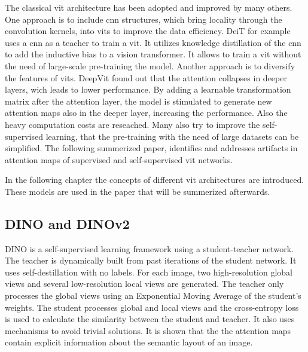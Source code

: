 \documentclass[conference]{IEEEtran}
\begin{document}
  The classical \ac{vit} architecture has been adopted and improved by many others. One approach is to include \ac{cnn} structures, which bring locality through the convolution kernels, into \acp{vit} to improve the data efficiency. DeiT \cite{deit} for example uses a \ac{cnn} as a teacher to train a \ac{vit}. It utilizes knowledge distillation of the \ac{cnn} to add the inductive bias to a vision transformer. It allows to train a \ac{vit} without the need of large-scale pre-training the model. \cite{vit-state-challenges} Another approach is to diversify the features of \acp{vit}. DeepVit \cite{deepvit} found out that the attention collapses in deeper layers, wich leads to lower performance. By adding a learnable transformation matrix after the attention layer, the model is stimulated to generate new attention maps also in the deeper layer, increasing the performance. \cite{vit-state-challenges} Also the heavy computation costs are reseached. Many also try to improve the self-supervised learning, that the pre-training with the need of large datasets can be simplified. \cite{vit-state-challenges} The following summerized paper, identifies and addresses artifacts in attention maps of supervised and self-supervised \ac{vit} networks.
  
  In the following chapter the concepts of different \ac{vit} architectures are introduced. These models are used in the paper \cite{registers} that will be summerized afterwards.

  \subsection{\mbox{DINO} and \mbox{DINOv2}}
  \cite{dino} \cite{dinov2}
  \mbox{DINO} is a self-supervised learning framework using a student-teacher network. The teacher is dynamically built from past iterations of the student network. It uses self-destillation with no labels. For each image, two high-resolution global views and several low-resolution local views are generated. The teacher only processes the global views using an Exponential Moving Average of the student's weights. The student processes global and local views and the cross-entropy loss is used to calculate the similarity between the student and teacher. It also uses mechanisms to avoid trivial solutions. \cite{dino} It is shown that the the attention maps contain explicit information about the semantic layout of an image. \cite{registers}
\end{document}
